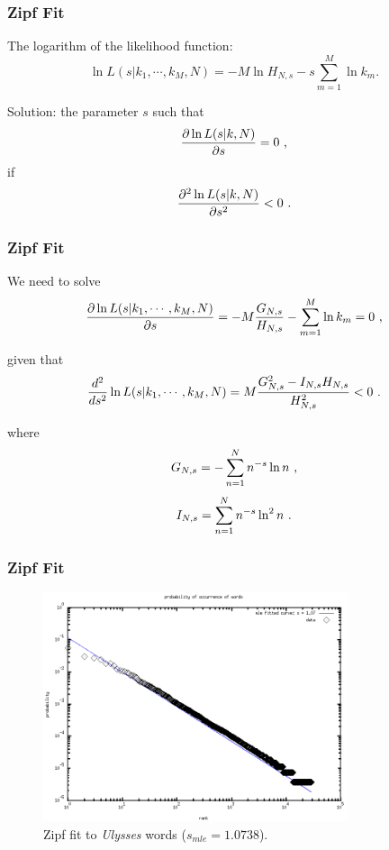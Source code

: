 \documentclass[notes]{beamer}
\begin{document}
\frame
{
  \frametitle{Zipf Fit}
  The logarithm of the likelihood function:
  \begin{equation}
  \ln L(s|k_1,\cdots,k_M,N) = -M \ln H_{N,s} - s \sum_{m=1}^{M} \ln k_m .
  \end{equation}

  Solution:
  the parameter $s$ such that
  \begin{equation}
  \label{eq:dervloglikelihood}
  \frac{\partial \ln L(s|k,N)}{\partial s} = 0  \textmd{ ,}
  \end{equation}
  if
  \begin{equation}
  \frac{\partial^2 \ln L(s|k,N)}{\partial s^2} < 0 \textmd{ .}
  \end{equation}
}


\frame
{
  \frametitle{Zipf Fit}
  We need to solve
  \begin{equation}
  \frac{\partial \ln L(s|k_1,\cdots,k_M,N)}{\partial s}  = -M \frac{G_{N,s}}{H_{N,s}} - \sum_{m=1}^{M} \ln k_m  = 0 \textmd{ ,}
  \end{equation}

  given that
  \begin{equation}
  \frac{d^2}{ds^2} \ln L(s|k_1,\cdots,k_M,N) = M \frac{  G_{N,s}^2 - I_{N,s} H_{N,s}  } {H_{N,s}^2} < 0 \textmd{ .}
  \end{equation}

  where
  \begin{equation}
  G_{N,s} = - \sum_{n=1}^{N} n^{-s} \ln n  \textmd{ ,}
  \end{equation}
  \begin{equation}
  I_{N,s} = \sum_{n=1}^{N} n^{-s} \ln^2 n \textmd{ .}
  \end{equation}
}



\frame
{
  \frametitle{Zipf Fit}
  \vspace{-0.3cm}
  \begin{figure}[h]
  \centering
  \includegraphics[width=0.8\textwidth]{imagespresentation/ulysses_fittedcurve_words_probabilities300a.png}
  \caption{Zipf fit to \emph{Ulysses} words ($s_{mle}=1.0738$).}
  \end{figure}
}
\end{document}
